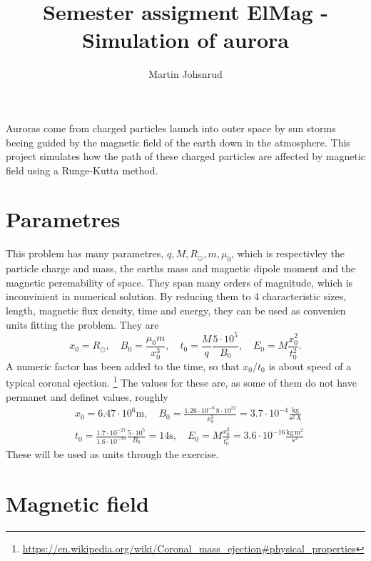 \documentclass{article}
\title{Semester assigment ElMag - Simulation of aurora}
\author{Martin Johsnrud}
\begin{document}
    \maketitle

    Auroras come from charged particles launch into outer space by sun storms beeing guided by the magnetic field of the earth down in the atmosphere. This project simulates how the path of these charged particles are affected by magnetic field using a Runge-Kutta method.
    
    \section*{Parametres}
        This problem has many parametres, $q, M, R_{\odot}, m, \mu_0$, which is respectivley the particle charge and mass, the earths mass and magnetic dipole moment and the magnetic peremability of space. They span many orders of magnitude, which is inconvinient in numerical solution. By reducing them to 4 characteristic sizes,  length, magnetic flux density, time and energy, they can be used as convenien units fitting the problem. They are
        \begin{equation*}
            x_0 = R_{\odot}, \quad  
            B_0 = \frac{\mu_0 m}{x_0^3}, \quad 
            t_0 = \frac{M}{q}\frac{5\cdot 10^5}{B_0},  \quad 
            E_0 = M\frac{x_0^2}{t_0^2}.
        \end{equation*}
        A numeric factor has been added to the time, so that $x_0 / t_0$ is about speed of a typical coronal ejection. \footnote[1]{\url{https://en.wikipedia.org/wiki/Coronal_mass_ejection#physical_properties}} The values for these are, as some of them do not have permanet and definet values, roughly 
        \begin{align*}
            & x_0 = 6.47 \cdot 10^6 \textrm{m}, \quad
            B_0 = \frac{1.26 \cdot 10^{-6} \, 8 \cdot 10^{22}}{x_0^3} = 3.7 \cdot 10^{-4} \frac{\textrm{kg}}{\textrm{s}^{2} \, \textrm{A}} \\
            &t_0 = \frac{1.7 \cdot 10^{-27}}{1.6\cdot10^{-19}}\frac{5\cdot 10^5}{B_0} = 14 \textrm{s}, \quad 
            E_0 = M\frac{x_0^2}{t_0^2} = 3.6 \cdot 10^{-16} \frac{\textrm{kg} \, \textrm{m}^2}{\textrm{s}^2}
        \end{align*}
        These will be used as units through the exercise.

    \section*{Magnetic field}
\end{document}
